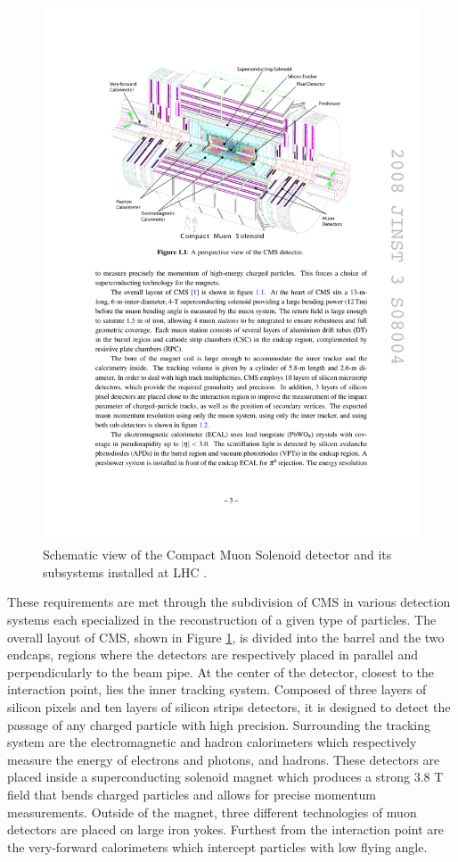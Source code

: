     \begin{figure}[h!]
      \centering
      \includegraphics[width=\textwidth]{img/I-3-cms/cms.pdf}
      \caption{Schematic view of the Compact Muon Solenoid detector and its subsystems installed at LHC \cite{1748-0221-3-08-S08004}.}
      \label{fig:I-3-cms-global-view}
    \end{figure}

    These requirements are met through the subdivision of CMS in various detection systems each specialized in the reconstruction of a given type of particles. The overall layout of CMS, shown in Figure \ref{fig:I-3-cms-global-view}, is divided into the barrel and the two endcaps, regions where the detectors are respectively placed in parallel and perpendicularly to the beam pipe. At the center of the detector, closest to the interaction point, lies the inner tracking system. Composed of three layers of silicon pixels and ten layers of silicon strips detectors, it is designed to detect the passage of any charged particle with high precision. Surrounding the tracking system are the electromagnetic and hadron calorimeters which respectively measure the energy of electrons and photons, and hadrons. These detectors are placed inside a superconducting solenoid magnet which produces a strong 3.8 T field that bends charged particles and allows for precise momentum measurements. Outside of the magnet, three different technologies of muon detectors are placed on large iron yokes. Furthest from the interaction point are the very-forward calorimeters which intercept particles with low flying angle. \\

